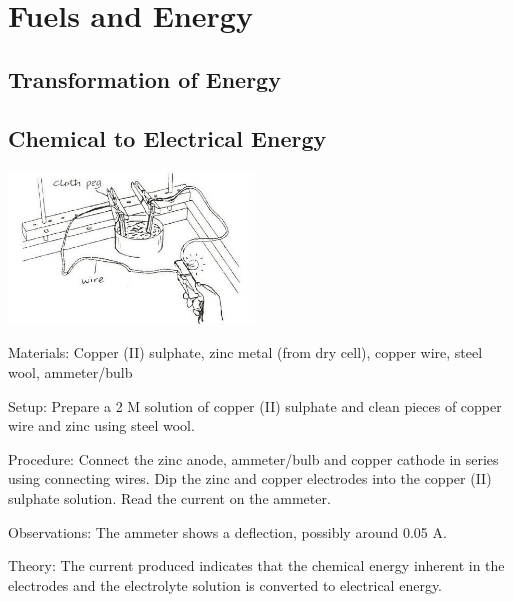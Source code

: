 \section{Fuels and Energy}

\begin{multicols}{2}


\section*{Transformation of Energy}


\subsection{Chemical to Electrical Energy} %

\begin{center}
\includegraphics[width=0.49\textwidth]{./img/source/chem-energy.jpg}
\end{center}

\begin{description*}
\item[Materials:]{Copper (II) sulphate, zinc metal (from dry cell), copper wire, steel wool, ammeter/bulb}
\item[Setup:]{Prepare a 2 M solution of copper (II) sulphate and clean pieces of copper wire and zinc using steel wool.}
\item[Procedure:]{Connect the zinc anode, ammeter/bulb and copper cathode in series using connecting wires. Dip the zinc and copper electrodes into the copper (II) sulphate solution. Read the current on the ammeter.}
\item[Observations:]{The ammeter shows a deflection, possibly around 0.05 A.}
\item[Theory:]{The current produced indicates that the chemical energy inherent in the electrodes and the electrolyte solution is converted to electrical energy.}
\end{description*}


\end{multicols}
